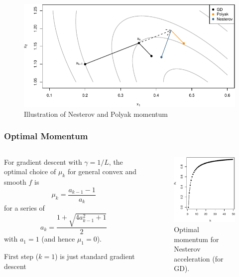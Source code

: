 \documentclass[aspectratio=1610,onlytextwidth]{beamer}
\begin{document}
\begin{frame}[c]
  \begin{figure}[htpb]
    \centering
    \includegraphics[]{images/momentum-illustration.pdf}
    \caption{%
      Illustration of Nesterov and Polyak momentum
    }
  \end{figure}
\end{frame}

\begin{frame}[c]
  \frametitle{Optimal Momentum}
  \begin{columns}
    \begin{column}{0.45\textwidth}
      For gradient descent with \(\gamma = 1/L\), the optimal choice of \(\mu_k\) for
      general convex and smooth \(f\) is
      \[
        \mu_k = \frac{a_{k-1} - 1}{a_{k}}
      \]
      for a series of
      \[
        a_k = \frac{1 + \sqrt{4a_{k-1}^2 + 1}}{2}
      \]
      with \(a_1 = 1\) (and hence \(\mu_1 = 0\)).

      \bigskip\pause

      First step (\(k = 1\)) is just standard gradient descent
    \end{column}
    \begin{column}{0.45\textwidth}
      \begin{figure}[htpb]
        \centering
        \includegraphics[]{images/nesterov-weights.pdf}
        \caption{%
          Optimal momentum for Nesterov acceleration (for GD).
        }
      \end{figure}

    \end{column}
  \end{columns}
\end{frame}
\end{document}

